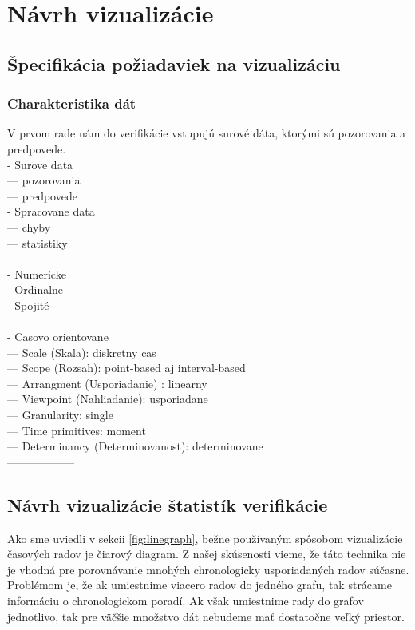 \chapter{Návrh vizualizácie}


\section{Špecifikácia požiadaviek na vizualizáciu}

\subsection{Charakteristika dát}
V prvom rade nám do verifikácie vstupujú surové dáta, ktorými sú pozorovania a predpovede.\\
- Surove data\\
--- pozorovania \\
--- predpovede \\
- Spracovane data \\
--- chyby \\
--- statistiky \\
------------------\\
- Numericke \\
- Ordinalne \\
- Spojité \\
--------------------\\
- Casovo orientovane \\
--- Scale (Skala): diskretny cas \\
--- Scope (Rozsah): point-based aj interval-based \\
--- Arrangment (Usporiadanie) : linearny \\
--- Viewpoint (Nahliadanie): usporiadane \\
--- Granularity: single \\
--- Time primitives: moment \\
--- Determinancy (Determinovanost): determinovane \\ 
------------------\\



\section{Návrh vizualizácie štatistík verifikácie} 
Ako sme uviedli v sekcii \ref{fig:linegraph}, bežne používaným spôsobom vizualizácie časových radov je čiarový diagram. Z našej skúsenosti vieme, že táto technika nie je vhodná pre porovnávanie mnohých chronologicky usporiadaných radov súčasne. Problémom je, že ak umiestnime viacero radov do jedného grafu, tak strácame informáciu o chronologickom poradí. Ak však umiestnime rady do grafov jednotlivo, tak pre väčšie množstvo dát nebudeme mať dostatočne veľký priestor.

